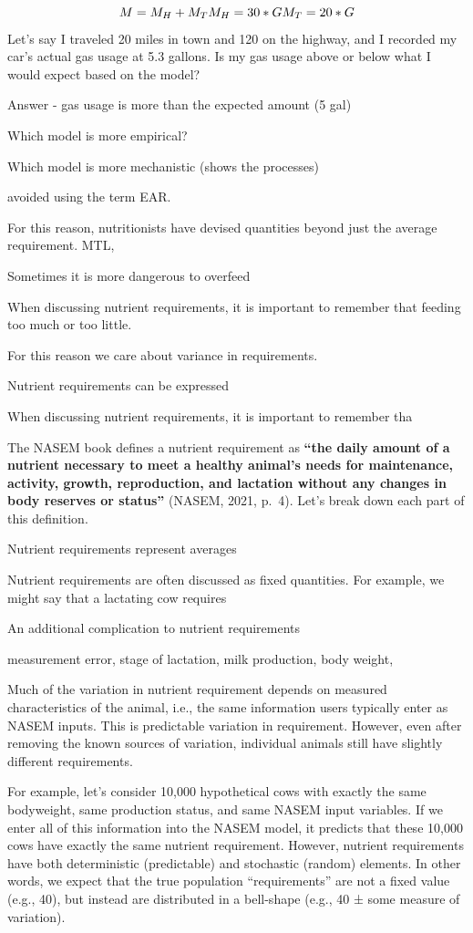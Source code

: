 \documentclass[
]{book}
\begin{document}
\[
M = M_H + M_T \\
M_H = 30 * G \\
M_T = 20 * G
\]
Let's say I traveled 20 miles in town and 120 on the highway, and I recorded my car's actual gas usage at 5.3 gallons. Is my gas usage above or below what I would expect based on the model?

Answer - gas usage is more than the expected amount (5 gal)

Which model is more empirical?

Which model is more mechanistic (shows the processes)

avoided using the term EAR.

For this reason, nutritionists have devised quantities beyond just the average requirement. MTL,

Sometimes it is more dangerous to overfeed

When discussing nutrient requirements, it is important to remember that feeding too much or too little.

For this reason we care about variance in requirements.

Nutrient requirements can be expressed

When discussing nutrient requirements, it is important to remember tha

The NASEM \citeyearpar{NASEM8} book defines a nutrient requirement as \textbf{``the daily amount of a nutrient necessary to meet a healthy animal's needs for maintenance, activity, growth, reproduction, and lactation without any changes in body reserves or status''} (NASEM, 2021, p.~4). Let's break down each part of this definition.

Nutrient requirements represent averages

Nutrient requirements are often discussed as fixed quantities. For example, we might say that a lactating cow requires

An additional complication to nutrient requirements

measurement error, stage of lactation, milk production, body weight,

Much of the variation in nutrient requirement depends on measured characteristics of the animal, i.e., the same information users typically enter as NASEM \citeyearpar{NASEM8} inputs. This is predictable variation in requirement. However, even after removing the known sources of variation, individual animals still have slightly different requirements.

For example, let's consider 10,000 hypothetical cows with exactly the same bodyweight, same production status, and same NASEM \citeyearpar{NASEM8} input variables. If we enter all of this information into the NASEM model, it predicts that these 10,000 cows have exactly the same nutrient requirement. However, nutrient requirements have both deterministic (predictable) and stochastic (random) elements. In other words, we expect that the true population ``requirements'' are not a fixed value (e.g., 40), but instead are distributed in a bell-shape (e.g., 40 ± some measure of variation).
\end{document}
